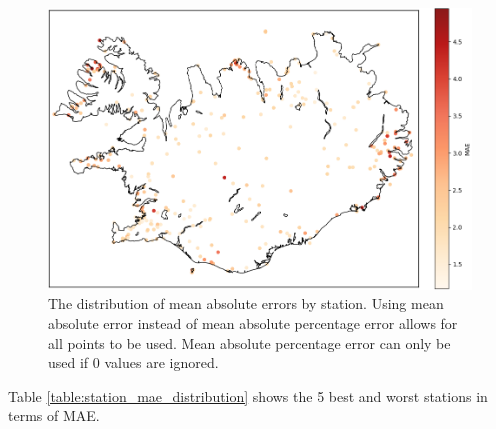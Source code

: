 \begin{figure}
    \includegraphics[scale=0.6]{Figures/MAEoverIceland.png}
    \caption[Distribution of mean absolute errors by station]{The distribution of mean absolute errors by station. Using mean absolute error instead of mean absolute percentage error allows for all points to be used. Mean absolute percentage error can only be used if 0 values are ignored.}
    \label{fig:station_mae_distribution}
\end{figure}

Table \ref{table:station_mae_distribution} shows the 5 best and worst stations in terms of MAE.

\begin{table}[h]
    \caption[]{}
    \label{table:station_mae_distribution}
\end{table}

